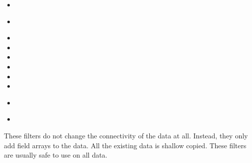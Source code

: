 \begin{multicols}{2}
  \begin{itemize}
  \item {}
  \item {}~\contour
  \item {}
  \item {}
  \item {}
  \item {}
  \item {}
  \item {}
  \item {}~\slice
  \item {}~\streamTracer
  \end{itemize}
\end{multicols}

These filters do not change the connectivity of the data at all.  Instead,
they only add field arrays to the data.  All the existing data is shallow
copied.  These filters are usually safe to use on all data.


